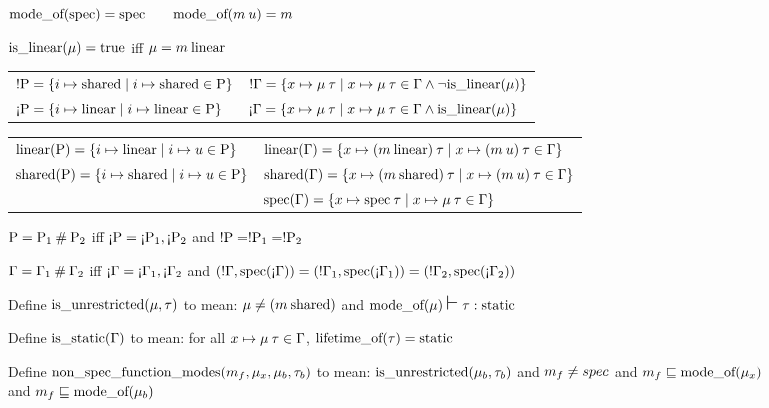 \begin{figure}
\begin{flushleft}
{\small

$\textrm{mode\_of}(\textrm{spec}) = \textrm{spec} \quad\quad \textrm{mode\_of}(m\: u) = m$

$\textrm{is\_linear}(\mu) = \textrm{true}$ iff $\mu = m\: \textrm{linear}$

\begin{tabular}{ll}
$!\textrm{P} = \{i \mapsto \textrm{shared} \;|\; i \mapsto \textrm{shared} \in \textrm{P}\}$
&
$!\Gamma = \{x \mapsto \mu\: \tau \;|\; x \mapsto \mu\: \tau \in \Gamma \wedge \neg \textrm{is\_linear}(\mu)\}$
\\
$\text{!`}\textrm{P} =  \{i \mapsto \textrm{linear} \;|\; i \mapsto \textrm{linear} \in \textrm{P}\}$
&
$\text{!`}\Gamma =  \{x \mapsto \mu\: \tau \;|\; x \mapsto \mu\: \tau \in \Gamma \wedge \textrm{is\_linear}(\mu)\}$
\end{tabular}

\begin{tabular}{ll}
$\textrm{linear}(\textrm{P}) = \{i \mapsto \textrm{linear} \;|\; i \mapsto u \in \textrm{P}\}$
&
$\textrm{linear}(\Gamma) = \{x \mapsto (m\: \textrm{linear})\: \tau \;|\; x \mapsto (m\: u)\: \tau \in \Gamma\}$
\\
$\textrm{shared}(\textrm{P}) = \{i \mapsto \textrm{shared} \;|\; i \mapsto u \in \textrm{P}\}$
&
$\textrm{shared}(\Gamma) = \{x \mapsto (m\: \textrm{shared})\: \tau \;|\; x \mapsto (m\: u)\: \tau \in \Gamma\}$
\\
$ $
&
$\textrm{spec}(\Gamma) = \{x \mapsto \textrm{spec}\: \tau \;|\; x \mapsto \mu\: \tau \in \Gamma\}$
\end{tabular}

$\textrm{P} = \textrm{P}_1\:\#\:\textrm{P}_2$ iff $\text{!`}\textrm{P} = \text{!`}\textrm{P}_1, \text{!`}\textrm{P}_2$ and $!\textrm{P} = !\textrm{P}_1 = !\textrm{P}_2$

$\Gamma = \Gamma_1\:\#\:\Gamma_2$ iff $\text{!`}\Gamma = \text{!`}\Gamma_1, \text{!`}\Gamma_2$ and $(!\Gamma, \textrm{spec}(\text{!`}\Gamma)) = (!\Gamma_1, \textrm{spec}(\text{!`}\Gamma_1)) = (!\Gamma_2, \textrm{spec}(\text{!`}\Gamma_2))$

Define $\textrm{is\_unrestricted}(\mu, \tau)$ to mean: $\mu \neq (m\: \textrm{shared})$
and $\textrm{mode\_of}(\mu)\: \mbox{\Large $\vdash$}\; \tau : \textrm{static}$

Define $\textrm{is\_static}(\Gamma)$ to mean: for all $x\mapsto\mu\: \tau\in\Gamma$, $\textrm{lifetime\_of}(\tau) = \textrm{static}$

Define $\textrm{non\_spec\_function\_modes}(m_f, \mu_x, \mu_b, \tau_b)$ to mean:
$\textrm{is\_unrestricted}(\mu_b, \tau_b)$ and
$m_f \neq spec$ and
$m_f \sqsubseteq \textrm{mode\_of}(\mu_x)$ and
$m_f \sqsubseteq \textrm{mode\_of}(\mu_b)$

}
\end{flushleft}
\end{figure}
